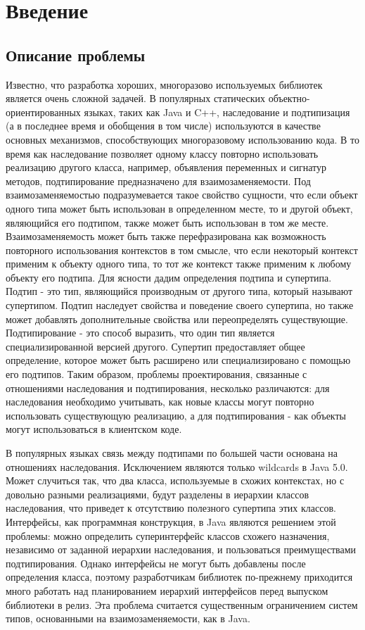 \section{Введение}
\label{sec:Chapter0} 

\subsection{Описание проблемы}

Известно, что разработка хороших, многоразово используемых библиотек является очень сложной задачей.
В популярных статических объектно-ориентированных языках, таких как Java и C++, наследование и подтипизация
(а в последнее время и обобщения в том числе) используются в качестве основных механизмов, способствующих многоразовому
использованию кода.
В то время как наследование позволяет одному классу повторно использовать реализацию
другого класса, например, объявления переменных и сигнатур методов, подтипирование предназначено для взаимозаменяемости.
Под взаимозаменяемостью подразумевается такое свойство сущности, что если объект одного типа может быть использован в
определенном месте, то и другой объект, являющийся его подтипом, также может быть использован в том же месте.
Взаимозаменяемость может быть также перефразирована как возможность повторного использования контекстов в том смысле,
что если некоторый контекст применим к объекту одного типа, то тот же контекст также применим к любому объекту его подтипа.
Для ясности дадим определения подтипа и супертипа.
Подтип - это тип, являющийся производным от другого типа, который называют супертипом.
Подтип наследует свойства и поведение своего супертипа, но также может добавлять дополнительные свойства или
переопределять существующие.
Подтипирование - это способ выразить, что один тип является специализированной версией другого.
Супертип предоставляет общее определение, которое может быть расширено или специализировано с помощью его подтипов.
Таким образом, проблемы проектирования, связанные с отношениями наследования и подтипирования, несколько различаются:
для наследования необходимо учитывать, как новые классы могут повторно использовать существующую реализацию,
а для подтипирования - как объекты могут использоваться в клиентском коде.

В популярных языках связь между подтипами по большей части основана на отношениях наследования.
Исключением являются только wildcards в Java 5.0.
Может случиться так, что два класса, используемые в схожих контекстах, но с довольно разными реализациями,
будут разделены в иерархии классов наследования, что приведет к отсутствию полезного супертипа этих классов.
Интерфейсы, как программная конструкция, в Java являются решением этой проблемы: можно определить суперинтерфейс
классов схожего назначения, независимо от заданной иерархии наследования, и пользоваться преимуществами подтипирования.
Однако интерфейсы не могут быть добавлены после определения класса, поэтому разработчикам библиотек по-прежнему
приходится много работать над планированием иерархий интерфейсов перед выпуском библиотеки в релиз.
Эта проблема считается существенным ограничением систем типов, основанными на взаимозаменяемости, как в Java.


